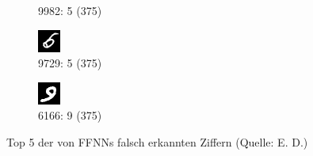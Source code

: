 \documentclass[a4paper,12pt,ngerman,oneside]{scrreprt}	%
\begin{document}
\begin{figure}[h]
\begin{subfigure}[t]{.19\linewidth}
				\caption{9982: 5 (375)}
			\end{subfigure}
			\begin{subfigure}[t]{.19\linewidth}
				\centering
				\includegraphics[height=0.6\linewidth]{top5FFNN/5-9729.png}
				\caption{9729: 5 (375)}
			\end{subfigure}
			\begin{subfigure}[t]{.19\linewidth}
				\centering
				\includegraphics[height=0.6\linewidth]{top5FFNN/9-6166.png}
				\caption{6166: 9 (375)}
			\end{subfigure}
			\vspace*{-2mm}
			\caption{Top 5 der von FFNNs falsch erkannten Ziffern (Quelle: E. D.)}\label{top5FFNN}
		\end{figure}
		\vspace*{-3mm}
\end{document}
